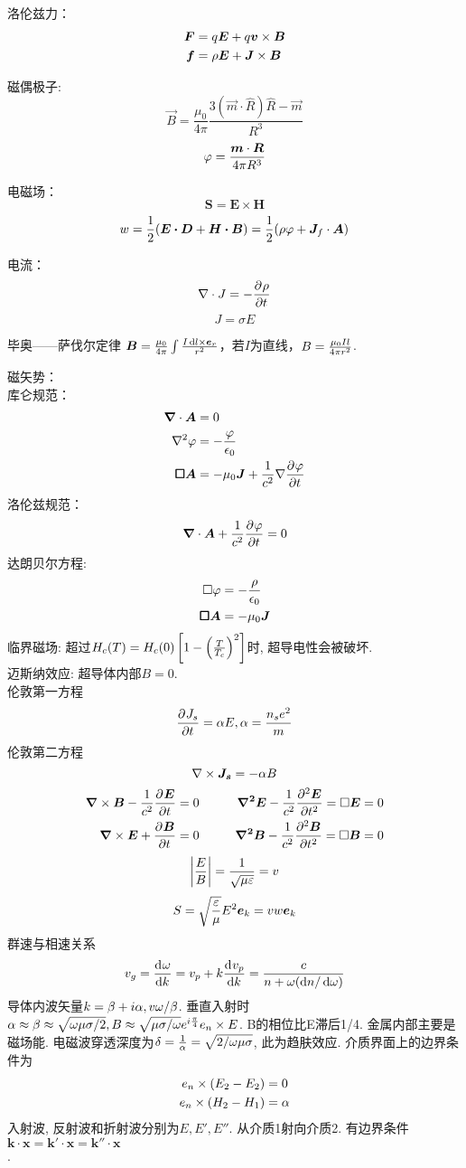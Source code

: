 \documentclass[UTF8,9pt]{ctexart}
\begin{document}
洛伦兹力：$$\ar{
    \bm{F}  \x  q\bm{E}+q\bm{v}\times\bm{B}\\
    \bm{f}  \x  \rho\bm{E}+\bm{J}\times\bm{B}
}$$

磁偶极子:
$$ 
\vec{B}=\frac{\mu_{0}}{4 \pi} \frac{3(\vec{m} \cdot \widehat{R}) \widehat{R}-\vec{m}}{R^{3}}
 $$
$$\vp = \f{\bm{m}\cdot\bm{R}}{4\pi R^3}$$

电磁场：
$$\bm{S}=\bm{E}\times\bm{H}$$
$$w=\ff{2}(\bm{E\cdot D}+\bm{H\cdot B})=\ff{2}(\rho\vp+\bm{J}_f\cdot\bm{A})$$

电流：
$$\nabla\cdot J=-\pt{\rho}$$
$$J=\sigma E$$

毕奥——萨伐尔定律  $\bm{B}=\frac{\mu_0}{4\pi}\int\frac{I\d l\times \bm{e}_r}{r^2}$，若$I$为直线，$B=\f{\mu_0Il}{4\pi r^2}$.


磁矢势：\\
库仑规范：
$$\ar{
    \bm{\nabla}\cdot \bm{A} \x 0\\
    \nabla^2 \varphi \x -\f{\varphi}{\epsilon_0}\\
    \bm{\square A} \x -\mu_0\bm{J}+\ff{c^2}\nabla\pt{\varphi}
}$$
洛伦兹规范：
$$  \bm{\nabla}\cdot\bm{A}+\ff{c^2}\pt{\varphi} = 0$$
达朗贝尔方程:
$$    \ar{\square \varphi \x -\f{\rho}{\epsilon_0}\\
    \bm{\square A} \x -\mu_0\bm{J}}$$
临界磁场: 超过$H_c(T)=H_c(0)\left[1-\of{\f{T}{T_c}}^2\right]$时, 超导电性会被破坏. \\
迈斯纳效应: 超导体内部$B=0$. \\
伦敦第一方程
$$\pp{J_s}{t}=\a E,\a=\f{n_se^2}{m}$$
伦敦第二方程
$$\nabla\tm\bm{J_s}=-\a B$$
$$\ar{
    \bm{\nabla}\times \bm{B}-\ff{c^2}\pt{\bm{E}} \x  0\quad&\quad \bm{\nabla^2 E}-\ff{c^2}\pt[2]{\bm{E}}=\square \bm{E} \x  0\\
    \bm{\nabla}\times \bm{E}+\pt{\bm{B}} \x  0&\bm{\nabla^2 B}-\ff{c^2}\pt[2]{\bm{B}}=\square \bm{B} \x  0
}$$
$$\abs{\f{E}{B}}=\ff{\sqrt{\mu\ep}}=v$$
$$S=\sqrt{\f{\ep}{\mu}}E^2\bm{e}_k=vw\bm{e}_k$$
群速与相速关系
$$v_g=\dd{\o}{k}=v_p+k\dd{v_p}{k}=\f{c}{n+\o(\d n/\d\o)}$$
导体内波矢量$k=\b+i\a,v\o/\b$. 垂直入射时$\a\approx\b\approx\sqrt{\o\mu\sg/2}, B\approx \sqrt{\mu\sg/\o}e^{i\f{\pi}{4}}e_n\tm E$. B的相位比E滞后1/4. 金属内部主要是磁场能. 电磁波穿透深度为$\de=\ff{\a}=\sqrt{2/\o\mu\sg}$, 此为趋肤效应. 
介质界面上的边界条件为
$$\ar{
    e_n\tm(E_2-E_2)\x0\\
    e_n\tm(H_2-H_1)\x\a
}$$
入射波, 反射波和折射波分别为$E,E',E''$. 从介质1射向介质2. 有边界条件$\bm{k\cdot x}=\bm{k'\cdot x}=\bm{k''\cdot x}$\\.
\end{document}
